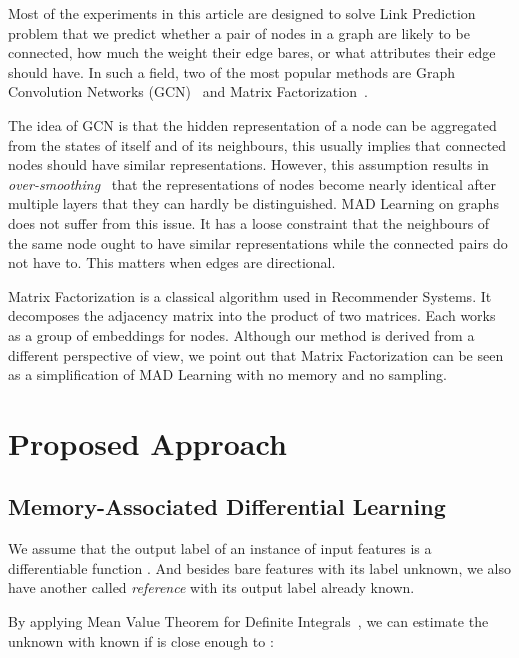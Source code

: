 \documentclass{article}
\begin{document}
Most of the experiments in this article are designed to solve Link
Prediction problem that we predict whether a pair of nodes in a graph
are likely to be connected, how much the weight their edge bares, or
what attributes their edge should have. In such a field, two of the most
popular methods are Graph Convolution Networks
(GCN)~\cite{DBLP:journals/corr/KipfW16} and Matrix
Factorization~\cite{koren2009matrix}.

The idea of GCN is that the hidden representation of a node can be
aggregated from the states of itself and of its neighbours, this
usually implies that connected nodes should have similar
representations. However, this assumption results in
\emph{over-smoothing}~\cite{DBLP:conf/iccv/Li0TG19} that the
representations of nodes become nearly identical after multiple
layers that they can hardly be distinguished.
MAD Learning on graphs does not suffer from this issue. It has a loose
constraint that the neighbours of the same node ought to have similar
representations while the connected pairs do not have to. This matters
when edges are directional.

Matrix Factorization is a classical algorithm used in Recommender Systems.
It decomposes the adjacency
matrix into the product of two matrices. Each works as a group of embeddings
for nodes. Although our method is derived from a different perspective
of view, we point out that Matrix Factorization can be seen as a
simplification of MAD Learning with no memory and no sampling.

\hypertarget{proposed-approach}{\section{Proposed Approach}\label{sec:proposed-approach}}

\hypertarget{memory-associated-differential-learning}{\subsection{Memory-Associated Differential Learning}\label{ssec:memory-associated-differential-learning}}

We assume that the output label  of an instance of input features
 is a differentiable function .
And besides bare features  with its label  unknown, we also
have another  called \emph{reference} with its output label
 already known.

By applying Mean Value Theorem for Definite
Integrals~\cite{comenetz2002calculus}, we can estimate
the unknown  with known  if  is close enough to :
\end{document}
